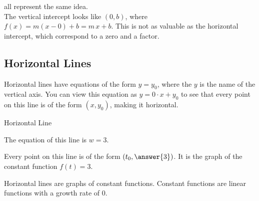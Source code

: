 \documentclass{ximera}
\begin{document}
all represent the same idea. \\



The vertical intercept looks like $(0, b)$, where $f(x) = m(x-0)+b = m \, x + b$.  This is not as valuable as the horizontal intercept, which correspond to a zero and a factor. \\










\subsection{Horizontal Lines} 

Horizontal lines have equations of the form $y = y_0$, where the $y$ is the name of the vertical axis. You can view this equation as $y = 0 \cdot x + y_0$ to see that every point on this line is of the form $(x, y_0)$, making it horizontal.





\begin{example} Horizontal Line





The equation of this line is $w=3$.  

\begin{image}
\end{image}

Every point on this line is of the form $\left(t_0, \answer{3}\right)$. It is the graph of the constant function $f(t)=3$.


\end{example}
Horizontal lines are graphs of constant functions.  Constant functions are linear functions with a growth rate of $0$. \\
\end{document}
